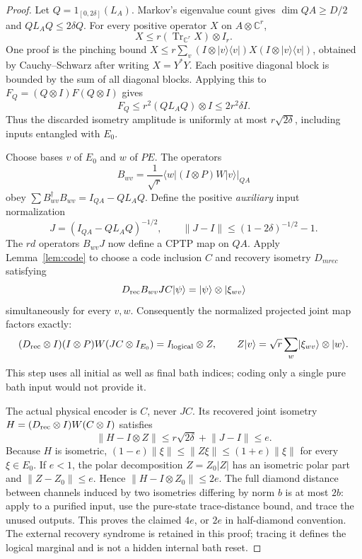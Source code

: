 \documentclass[11pt]{article}
\newcommand{\Tr}{\operatorname{Tr}}
\newcommand{\ket}[1]{\lvert #1\rangle}
\newcommand{\bra}[1]{\langle #1\rvert}
\newcommand{\norm}[1]{\lVert #1\rVert}
\begin{document}
\begin{proof}
Let $Q=1_{[0,2\delta]}(L_A)$. Markov's eigenvalue count gives $\dim QA\ge D/2$ and $QL_AQ\le2\delta Q$. For every positive operator $X$ on $A\otimes\mathbb C^r$,
\begin{equation}
 X\le r(\Tr_{\mathbb C^r}X)\otimes I_r.\label{eq:positiveblock}
\end{equation}
One proof is the pinching bound $X\le r\sum_v(I\otimes\ket v\bra v)X(I\otimes\ket v\bra v)$, obtained by Cauchy--Schwarz after writing $X=Y^*Y$. Each positive diagonal block is bounded by the sum of all diagonal blocks. Applying this to $F_Q=(Q\otimes I)F(Q\otimes I)$ gives
\[
 F_Q\le r^2(QL_AQ)\otimes I\le2r^2\delta I.
\]
Thus the discarded isometry amplitude is uniformly at most $r\sqrt{2\delta}$, including inputs entangled with $E_0$.

Choose bases $v$ of $E_0$ and $w$ of $PE$. The operators
\[
 B_{wv}=\frac1{\sqrt r}\bra w(I\otimes P)W\ket v\big|_{QA}
\]
obey $\sum B_{wv}^\dagger B_{wv}=I_{QA}-QL_AQ$. Define the positive \emph{auxiliary} input normalization
\[
 J=(I_{QA}-QL_AQ)^{-1/2},\qquad
 \norm{J-I}\le(1-2\delta)^{-1/2}-1.
\]
The $rd$ operators $B_{wv}J$ now define a CPTP map on $QA$. Apply Lemma~\ref{lem:code} to choose a code inclusion $C$ and recovery isometry $D_{
m rec}$ satisfying
\[
 D_{\rm rec}B_{wv}JC\ket\psi=\ket\psi\otimes\ket{\xi_{wv}}
\]
simultaneously for every $v,w$. Consequently the normalized projected joint map factors exactly:
\begin{equation}
 (D_{\rm rec}\otimes I)(I\otimes P)W(JC\otimes I_{E_0})
 =I_{\rm logical}\otimes Z,\qquad
 Z\ket v=\sqrt r\sum_w\ket{\xi_{wv}}\otimes\ket w.
 \label{eq:jointKL}
\end{equation}
This step uses all initial as well as final bath indices; coding only a single pure bath input would not provide it.

The actual physical encoder is $C$, never $JC$. Its recovered joint isometry $H=(D_{\rm rec}\otimes I)W(C\otimes I)$ satisfies
\[
 \norm{H-I\otimes Z}\le r\sqrt{2\delta}+\norm{J-I}\le e.
\]
Because $H$ is isometric, $(1-e)\norm\xi\le\norm{Z\xi}\le(1+e)\norm\xi$ for every $\xi\in E_0$. If $e<1$, the polar decomposition $Z=Z_0|Z|$ has an isometric polar part and $\norm{Z-Z_0}\le e$. Hence $\norm{H-I\otimes Z_0}\le2e$. The full diamond distance between channels induced by two isometries differing by norm $b$ is at most $2b$: apply to a purified input, use the pure-state trace-distance bound, and trace the unused outputs. This proves the claimed $4e$, or $2e$ in half-diamond convention. The external recovery syndrome is retained in this proof; tracing it defines the logical marginal and is not a hidden internal bath reset.
\end{proof}
\end{document}
